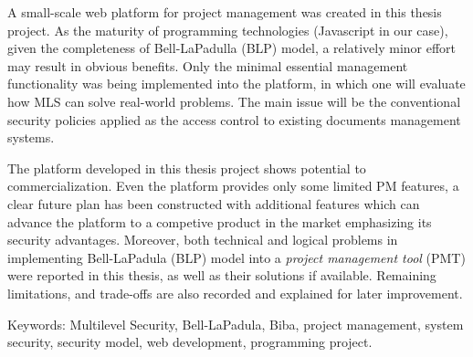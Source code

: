 A small-scale web platform for project management was created in this thesis project.
As the maturity of programming technologies (\eg Javascript in our case), given the completeness of Bell-LaPadulla (BLP) model, a relatively minor effort may result in obvious benefits.
Only the minimal essential management functionality was being implemented into the platform, in which one will evaluate how MLS can solve real-world problems.
The main issue will be the conventional security policies applied as the access control to existing documents management systems.

The platform developed in this thesis project shows potential to commercialization.
Even the platform provides only some limited PM features, a clear future plan has been constructed with additional features which can advance the platform to a competive product in the market emphasizing its security advantages.
Moreover, both technical and logical problems in implementing Bell-LaPadula (BLP) model into a \emph{project management tool} (PMT) were reported in this thesis, as well as their solutions if available.
Remaining limitations, and trade-offs are also recorded and explained for later improvement.

\bigskip
Keywords: Multilevel Security, Bell-LaPadula, Biba, project management, system security, security model, web development, programming project.
\endgroup			

\vfill
